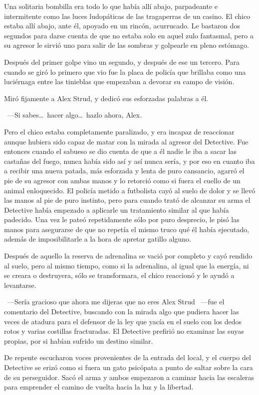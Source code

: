 Una solitaria bombilla era todo lo que había allí abajo, parpadeante e intermitente como las luces ludopáticas de las tragaperras de un casino. El chico estaba allí abajo, ante él, apoyado en un rincón, acurrucado. Le bastaron dos segundos para darse cuenta de que no estaba solo en aquel zulo fantasmal, pero a su agresor le sirvió uno para salir de las sombras y golpearle en pleno estómago.

Después del primer golpe vino un segundo, y después de ese un tercero. Para cuando se giró lo primero que vio fue la placa de policía que brillaba como una luciérnaga entre las tinieblas que empezaban a devorar su campo de visión.

Miró fijamente a Alex Strud, y dedicó sus esforzadas palabras a él.

~---Si sabes\dots\ hacer algo\dots\ hazlo ahora, Alex.

Pero el chico estaba completamente paralizado, y era incapaz de reaccionar aunque hubiera sido capaz de matar con la mirada al agresor del Detective. Fue entonces cuando el sabueso se dio cuenta de que a él nadie le iba a sacar las castañas del fuego, nunca había sido así y así nunca sería, y por eso en cuanto iba a recibir una nueva patada, más esforzada y lenta de puro cansancio, agarró el pie de su agresor con ambas manos y lo retorció como si fuera el cuello de un animal enloquecido. El policía metido a futbolista cayó al suelo de dolor y se llevó las manos al pie de puro instinto, pero para cuando trató de alcanzar su arma el Detective había empezado a aplicarle un tratamiento similar al que había padecido. Una vez le pateó repetidamente sólo por puro desprecio, le pisó las manos para asegurarse de que no repetía el mismo truco qué él había ejecutado, además de imposibilitarle a la hora de apretar gatillo alguno.

Después de aquello la reserva de adrenalina se vació por completo y cayó rendido al suelo, pero al mismo tiempo, como si la adrenalina, al igual que la energía, ni se creara o destruyera, sólo se transformara, el chico reaccionó y le ayudó a levantarse.

~---Sería gracioso que ahora me dijeras que no eres Alex Strud ~---fue el comentario del Detective, buscando con la mirada algo que pudiera hacer las veces de atadura para el defensor de la ley que yacía en el suelo con los dedos rotos y varias costillas fracturadas. El Detective prefirió no examinar las suyas propias, por si habían sufrido un destino similar.

De repente escucharon voces provenientes de la entrada del local, y el cuerpo del Detective se erizó como si fuera un gato psicópata a punto de saltar sobre la cara de su perseguidor. Sacó el arma y ambos empezaron a caminar hacia las escaleras para emprender el camino de vuelta hacia la luz y la libertad.


